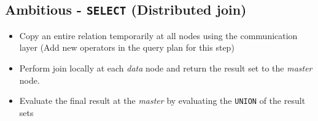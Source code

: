 \documentclass[letterpaper,11pt]{article}
\begin{document}
\subsection{Ambitious - \texttt{SELECT} (Distributed join)}
\begin{itemize}
\item Copy an entire relation temporarily at all nodes using the communication layer (Add new
operators in the query plan for this step)
\item Perform join locally at each \textit{data} node and return the result set to the \textit{master}
node.
\item Evaluate the final result at the \textit{master} by evaluating the \texttt{UNION} of the result
sets
\end{itemize}
\end{document}
